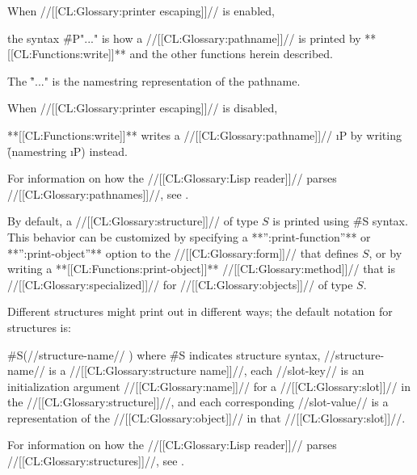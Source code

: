 \endsubsubsection%


When //[[CL:Glossary:printer escaping]]// is enabled,

the syntax \f{\#P"..."} is how a //[[CL:Glossary:pathname]]// is printed by **[[CL:Functions:write]]** and the other functions herein described.

The \f{"..."} is the namestring representation of the pathname.
 


When //[[CL:Glossary:printer escaping]]// is disabled,

**[[CL:Functions:write]]** writes a //[[CL:Glossary:pathname]]// \i{P} by writing \f{(namestring \i{P})} instead.

For information on how the //[[CL:Glossary:Lisp reader]]// parses //[[CL:Glossary:pathnames]]//, see \secref\SharpsignP.

\endsubsubsection%


By default, a //[[CL:Glossary:structure]]// of type $S$ is printed using \f{\#S} syntax. This behavior can be customized by specifying a **'':print-function''**  or **'':print-object''** option to the  //[[CL:Glossary:form]]// that defines $S$, or by writing a **[[CL:Functions:print-object]]** //[[CL:Glossary:method]]//  that is //[[CL:Glossary:specialized]]// for //[[CL:Glossary:objects]]// of type $S$.


Different structures might print out in different ways; the default notation for structures is:

\code
 #S(//structure-name// ) \endcode where \f{\#S} indicates structure syntax, //structure-name// is a //[[CL:Glossary:structure name]]//, each //slot-key// is an initialization argument //[[CL:Glossary:name]]// for a //[[CL:Glossary:slot]]// in the //[[CL:Glossary:structure]]//, and each corresponding //slot-value// is a representation of the //[[CL:Glossary:object]]// in that //[[CL:Glossary:slot]]//.

For information on how the //[[CL:Glossary:Lisp reader]]// parses //[[CL:Glossary:structures]]//, see \secref\SharpsignS.

